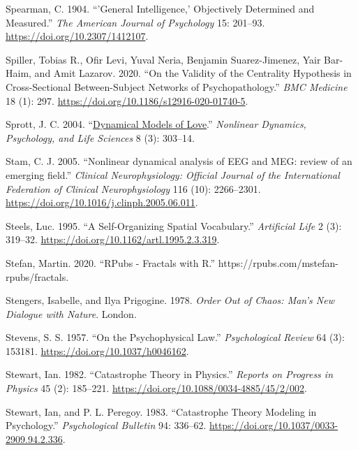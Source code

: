 \documentclass[
  a4paper,
  DIV=11,
  numbers=noendperiod,
  oneside]{scrreprt}
\newlength{\cslhangindent}
\newenvironment{CSLReferences}[2] %
 {\begin{list}{}{%
  \setlength{\itemindent}{0pt}
  \setlength{\leftmargin}{0pt}
  \setlength{\parsep}{0pt}
  \ifodd #1
   \setlength{\leftmargin}{\cslhangindent}
   \setlength{\itemindent}{-1\cslhangindent}
  \fi
  \setlength{\itemsep}{#2\baselineskip}}}
 {\end{list}}
\begin{document}
\begin{CSLReferences}{1}{0}
Spearman, C. 1904. {``'{General} Intelligence,' Objectively Determined
and Measured.''} \emph{The American Journal of Psychology} 15: 201--93.
\url{https://doi.org/10.2307/1412107}.

Spiller, Tobias R., Ofir Levi, Yuval Neria, Benjamin Suarez-Jimenez,
Yair Bar-Haim, and Amit Lazarov. 2020. {``On the Validity of the
Centrality Hypothesis in Cross-Sectional Between-Subject Networks of
Psychopathology.''} \emph{BMC Medicine} 18 (1): 297.
\url{https://doi.org/10.1186/s12916-020-01740-5}.

Sprott, J. C. 2004.
{``\href{https://www.ncbi.nlm.nih.gov/pubmed/15233877}{Dynamical Models
of Love}.''} \emph{Nonlinear Dynamics, Psychology, and Life Sciences} 8
(3): 303--14.

Stam, C. J. 2005. {``Nonlinear dynamical analysis of EEG and MEG: review
of an emerging field.''} \emph{Clinical Neurophysiology: Official
Journal of the International Federation of Clinical Neurophysiology} 116
(10): 2266--2301. \url{https://doi.org/10.1016/j.clinph.2005.06.011}.

Steels, Luc. 1995. {``A {Self-Organizing Spatial Vocabulary}.''}
\emph{Artificial Life} 2 (3): 319--32.
\url{https://doi.org/10.1162/artl.1995.2.3.319}.

Stefan, Martin. 2020. {``{RPubs} - {Fractals} with {R}.''}
https://rpubs.com/mstefan-rpubs/fractals.

Stengers, Isabelle, and Ilya Prigogine. 1978. \emph{Order {Out} of
{Chaos}: {Man}'s {New Dialogue} with {Nature}}. {London}.

Stevens, S. S. 1957. {``On the Psychophysical Law.''}
\emph{Psychological Review} 64 (3): 153181.
\url{https://doi.org/10.1037/h0046162}.

Stewart, Ian. 1982. {``Catastrophe Theory in Physics.''} \emph{Reports
on Progress in Physics} 45 (2): 185--221.
\url{https://doi.org/10.1088/0034-4885/45/2/002}.

Stewart, Ian, and P. L. Peregoy. 1983. {``Catastrophe Theory Modeling in
Psychology.''} \emph{Psychological Bulletin} 94: 336--62.
\url{https://doi.org/10.1037/0033-2909.94.2.336}.


\end{CSLReferences}
\end{document}
